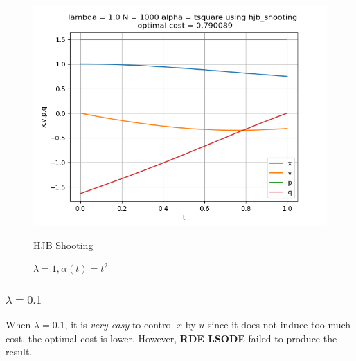 \begin{figure}[H]
\begin{minipage}{0.3\textwidth}
		\includegraphics[width=\linewidth]{hjb_shooting_l1_alphat2.png}
		\caption{HJB Shooting}
	\end{minipage}
	\caption{$\lambda = 1, \alpha(t) = t^2$}
\end{figure}

\subsubsection{$\lambda = 0.1$}

When $\lambda = 0.1$, it is \textit{very easy} to control $x$ by $u$ since it does not induce too much cost, the optimal cost is lower. However, \textbf{RDE LSODE} failed to produce the result.

